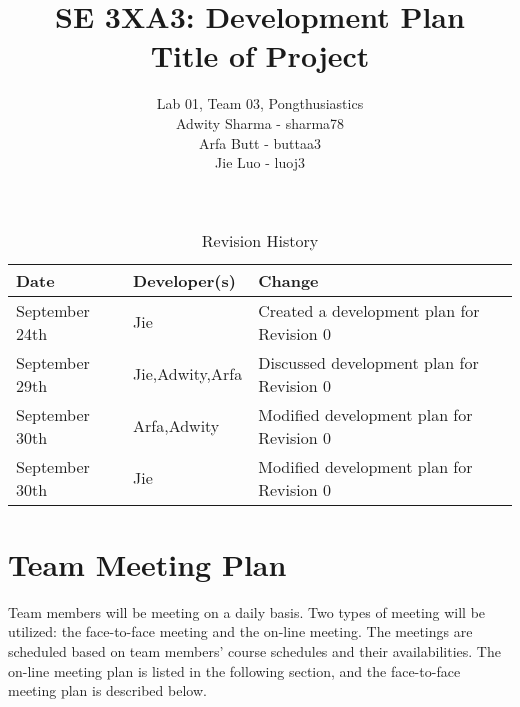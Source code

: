 \documentclass{article}
\title{SE 3XA3: Development Plan\\Title of Project}
\author{Lab 01, Team 03, Pongthusiastics 		
\\ Adwity Sharma - sharma78 		
\\ Arfa Butt - buttaa3 	
	\\ Jie Luo - luoj3 }
\date{}
\begin{document}
 
\begin{table}[hp]
 \caption{Revision History} \label{TblRevisionHistory} 
\begin{tabularx}{\textwidth}{llX} 
\toprule
 \textbf{Date} & \textbf{Developer(s)} & \textbf{Change}\\ 
\midrule 
September 24th & Jie  & Created a development plan for Revision 0\\ 
September 29th & Jie,Adwity,Arfa & Discussed development plan for Revision 0\\ 
September 30th & Arfa,Adwity & Modified development plan for Revision 0\\ 
September 30th & Jie  & Modified development plan for Revision 0\\ 
\bottomrule
 \end{tabularx} 
\end{table} 
\newpage 
\maketitle


\section {Team Meeting Plan} 

Team members will be meeting on a daily basis. Two types of meeting will be utilized: the face-to-face meeting and the on-line meeting. The meetings are scheduled based on team members' course schedules and their availabilities. The on-line meeting plan is listed in the following section, and the face-to-face meeting plan is described below.\\
\end{document}
